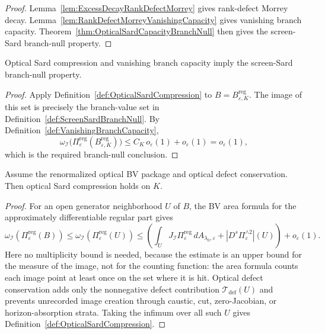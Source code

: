 \begin{proof}
Lemma~\ref{lem:ExcessDecayRankDefectMorrey} gives rank-defect Morrey decay. Lemma~\ref{lem:RankDefectMorreyVanishingCapacity} gives vanishing branch capacity. Theorem~\ref{thm:OpticalSardCapacityBranchNull} then gives the screen-Sard branch-null property.
\end{proof}

\begin{lemma}\label{lem:SardCapacityControlsBranchValues}
Optical Sard compression and vanishing branch capacity imply the screen-Sard branch-null property.
\end{lemma}

\begin{proof}
Apply Definition~\ref{def:OpticalSardCompression} to $B=B_{\varepsilon,K}^{\mathrm{reg}}$. The image of this set is precisely the branch-value set in Definition~\ref{def:ScreenSardBranchNull}. By Definition~\ref{def:VanishingBranchCapacity},
\[
    \omega_{\mathscr I}
    \bigl(\Pi_{\varepsilon}^{\mathrm{reg}}(B_{\varepsilon,K}^{\mathrm{reg}})\bigr)
    \le
    C_K\,o_\varepsilon(1)+o_\varepsilon(1)
    =
    o_\varepsilon(1),
\]
which is the required branch-null conclusion.
\end{proof}

\begin{lemma}\label{lem:BVAreaFormulaSardCompression}
Assume the renormalized optical BV package and optical defect conservation. Then optical Sard compression holds on $K$.
\end{lemma}

\begin{proof}
For an open generator neighborhood $U$ of $B$, the BV area formula for the approximately differentiable regular part gives
\[
    \omega_{\mathscr I}(\Pi_{\varepsilon}^{\mathrm{reg}}(B))
    \le
    \omega_{\mathscr I}(\Pi_{\varepsilon}^{\mathrm{reg}}(U))
    \le
    \left(
        \int_U J_{\mathscr I}\Pi_{\varepsilon}^{\mathrm{reg}}\,dA_{\lambda_0,\varepsilon}
        +
        |D^s\Pi_{\varepsilon}^{\wedge 2}|(U)
    \right)
    +
    o_\varepsilon(1).
\]
Here no multiplicity bound is needed, because the estimate is an upper bound for the measure of the image, not for the counting function: the area formula counts each image point at least once on the set where it is hit. Optical defect conservation adds only the nonnegative defect contribution $\mathcal T_{\mathrm{def}}(U)$ and prevents unrecorded image creation through caustic, cut, zero-Jacobian, or horizon-absorption strata. Taking the infimum over all such $U$ gives Definition~\ref{def:OpticalSardCompression}.
\end{proof}

